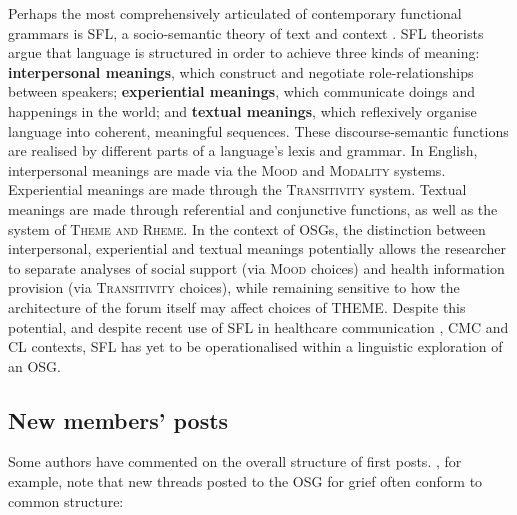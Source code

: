 \documentclass{article}
\renewcommand{\cite}{\parencite}
\begin{document}
Perhaps the most comprehensively articulated of contemporary functional grammars \cite{eggins_analysing_2004} is SFL, a socio-semantic theory of text and context \cite{halliday_introduction:_2004}. SFL theorists argue that language is structured in order to achieve three kinds of meaning: \textbf{interpersonal meanings}, which construct and negotiate role-relationships between speakers; \textbf{experiential meanings}, which communicate doings and happenings in the world; and \textbf{textual meanings}, which reflexively organise language into coherent, meaningful sequences. These discourse-semantic functions are realised by different parts of a language's lexis and grammar. In English, interpersonal meanings are made via the \textsc{Mood} and \textsc{Modality} systems. Experiential meanings are made through the \textsc{Transitivity} system. Textual meanings are made through referential and conjunctive functions, as well as the system of \textsc{Theme and Rheme}. In the context of OSGs, the distinction between interpersonal, experiential and textual meanings potentially allows the researcher to separate analyses of social support (via \textsc{Mood} choices) and health information provision (via \textsc{Transitivity} choices), while remaining sensitive to how the architecture of the forum itself may affect choices of THEME. Despite this potential, and despite recent use of SFL in healthcare communication \cite{matthiessen_applying_2013,slade_communicating_2015,woodward-kron_international_2016}, CMC \cite{lander_building_2014,zappavigna_enacting_2013} and CL \cite{hunston_systemic_2013,thompson_system_2014} contexts, SFL has yet to be operationalised within a linguistic exploration of an OSG.

\subsection{New members' posts}

Some authors have commented on the overall structure of first posts. \textcite{varga2014grieving}, for example, note that new threads posted to the OSG for grief often conform to common structure:
\end{document}
